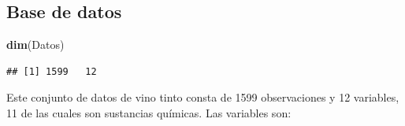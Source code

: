 \documentclass[
]{article}
\newenvironment{Shaded}{\begin{snugshade}}{\end{snugshade}}
\newcommand{\KeywordTok}[1]{\textcolor[rgb]{0.13,0.29,0.53}{\textbf{#1}}}
\newcommand{\NormalTok}[1]{#1}
\begin{document}
\hypertarget{base-de-datos}{%
\subsection{Base de datos}\label{base-de-datos}}

\begin{Shaded}
\begin{Highlighting}[]
\KeywordTok{dim}\NormalTok{(Datos)}
\end{Highlighting}
\end{Shaded}

\begin{verbatim}
## [1] 1599   12
\end{verbatim}

Este conjunto de datos de vino tinto consta de 1599 observaciones y 12
variables, 11 de las cuales son sustancias químicas. Las variables son:
\end{document}
